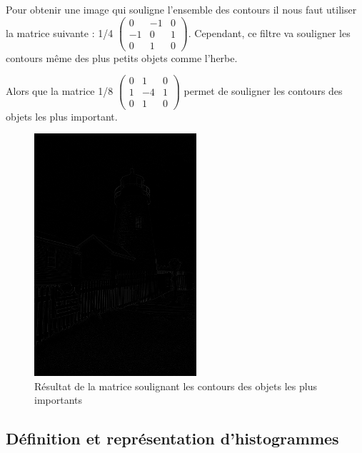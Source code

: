 Pour obtenir une image qui souligne l'ensemble des contours il nous faut utiliser la matrice suivante : 1/4
$\begin{pmatrix}
   0 & -1 & 0\\
   -1 & 0 & 1\\
   0 & 1 & 0
\end{pmatrix}$.
Cependant, ce filtre va souligner les contours même des plus petits objets comme l'herbe. 

Alors que la matrice 1/8
$\begin{pmatrix}
   0 & 1 & 0\\
   1 & -4 & 1\\
   0 & 1 & 0
\end{pmatrix}$
permet de souligner les contours des objets les plus important.

\begin{figure}[H]
      \center
      \includegraphics[width=6cm]{ressources/tp4/phare_mat_huit.png}
      \caption{Résultat de la matrice soulignant les contours des objets les plus importants}
\end{figure}

\subsection{Définition et représentation d'histogrammes}

